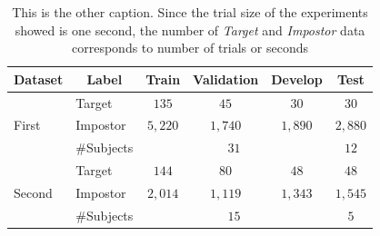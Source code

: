\begin{table}[H]
\centering
\caption[This is the caption]{ \footnotesize This is the other caption. Since the trial size of the experiments showed is one second, the number of \textit{Target} and \textit{Impostor} data corresponds to number of trials or seconds}
\label{tab:data_partition}
\footnotesize{
\begin{tabular}{@{}llcccc@{}}
\toprule
\textbf{Dataset}         & \multicolumn{1}{c}{\textbf{Label}} & \textbf{Train} & \textbf{Validation} & \textbf{Develop} & \textbf{Test} \\ \midrule
\midrule
\multirow{3}{*}{First} & Target   & $135$ & $45$  & $30$  & $30$  \\
                         & Impostor & $5,220$    & $1,740$ & $1,890$   & $2,880$    \\
\cmidrule(lr){3-5} \cmidrule(l){6-6}
                         & \#Subjects          & \multicolumn{3}{c}{$31$} & $12$ \\
\midrule
\multirow{3}{*}{Second}  & Target   & $144$ & $80$  & $48$  & $48$  \\
                         & Impostor & $2,014$    & $1,119$    & $1,343$    & $1,545$ \\
\cmidrule(lr){3-5} \cmidrule(l){6-6}
                         & \#Subjects   & \multicolumn{3}{c}{$15$} & $5$ \\ 
\bottomrule
\end{tabular}
}
\end{table}




